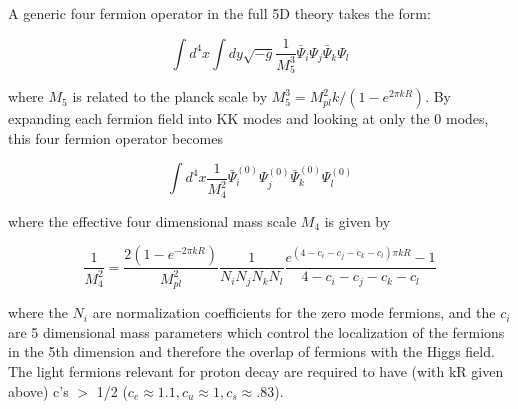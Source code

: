 \documentclass[aps,onecolumn,twoside,secnumarabic,balancelastpage,amsmath,amssymb,nofootinbib,hyperref=pdftex]{revtex4}
\begin{document}
A generic four fermion operator in the full 5D theory takes the form:

\begin{equation}
\int d^{4}x\int dy\sqrt{-g}\frac{1}{M_{5}^{3}}\bar{\Psi}_{i}\Psi_{j}\bar{\Psi}_{k}\Psi_{l}
\end{equation}

where $M_{5}$ is related to the planck scale by $M_{5}^{3} = M_{pl}^{2}k/(1 - e^{2\pi kR})$. By expanding each fermion field into KK modes and looking at only the 0 modes, this four fermion operator becomes

\begin{equation}
\int d^{4}x\frac{1}{M_{4}^{2}}\bar{\Psi}^{(0)}_{i}\Psi^{(0)}_{j}\bar{\Psi}^{(0)}_{k}\Psi^{(0)}_{l}
\end{equation}

where the effective four dimensional mass scale $M_{4}$ is given by

\begin{equation}
\frac{1}{M_{4}^{2}} = \frac{2(1-e^{-2\pi kR})}{M_{pl}^{2}}\frac{1}{N_{i}N_{j}N_{k}N_{l}}\frac{e^{(4 - c_i - c_j - c_k - c_l)\pi kR} - 1}{4 - c_i - c_j - c_k - c_l}
\end{equation}

where the $N_i$ are normalization coefficients for the zero mode fermions, and the $c_i$ are 5 dimensional mass parameters which control the localization of the fermions in the 5th dimension and therefore the overlap of fermions with the Higgs field. The light fermions relevant for proton decay are required to have (with kR given above) c's $>$ 1/2 ($c_{e} \approx 1.1, c_{u} \approx 1, c_{s} \approx .83$).
\end{document}
